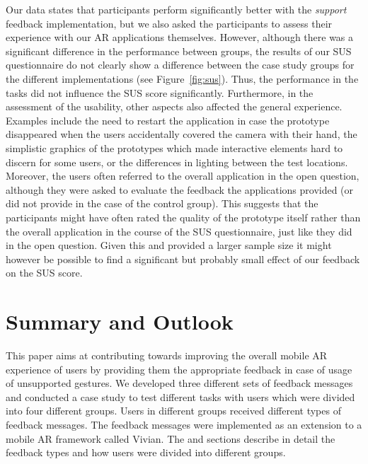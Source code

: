\documentclass[manuscript]{acmart}
\begin{document}
			Our data states that participants perform significantly better with the \emph{support} feedback implementation, but we also asked the participants to assess their experience with our \ac{AR} applications themselves. However, although there was a significant difference in the performance between groups, the results of our \ac{SUS} questionnaire do not clearly show a difference between the case study groups for the different implementations (see Figure~\ref{fig:sus}). Thus, the performance in the tasks did not influence the SUS score significantly. Furthermore, in the assessment of the usability, other aspects also affected the general experience. Examples include the need to restart the application in case the prototype disappeared when the users accidentally covered the camera with their hand, the simplistic graphics of the prototypes which made interactive elements hard to discern for some users, or the differences in lighting between the test locations. Moreover, the users often referred to the overall application in the open question, although they were asked to evaluate the feedback the applications provided (or did not provide in the case of the control group). This suggests that the participants might have often rated the quality of the prototype itself rather than the overall application in the course of the SUS questionnaire, just like they did in the open question. Given this and provided a larger sample size it might however be possible to find a significant but probably small effect of our feedback on the SUS score.

	\section{Summary and Outlook}\label{sec:summary}
		This paper aims at contributing towards improving the overall mobile \ac{AR} experience of users by providing them the appropriate feedback in case of usage of unsupported gestures. We developed three different sets of feedback messages and conducted a case study to test different tasks with users which were divided into four different groups. Users in different groups received different types of feedback messages. The feedback messages were implemented as an extension to a mobile \ac{AR} framework called Vivian. The \emph{} and \emph{} sections describe in detail the feedback types and how users were divided into different groups.
		
\end{document}
